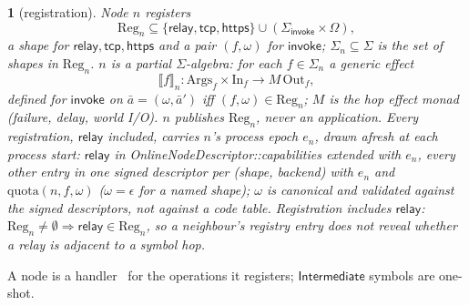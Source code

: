 \documentclass[journal]{IEEEtran}
\newcommand{\namedhead}{}
\newtheorem*{namedenv}{\namedhead}
\newenvironment{defD}[2]{\renewcommand{\namedhead}{Definition #1}%
  \begin{namedenv}[#2]}{\end{namedenv}}
\newcommand{\sem}[1]{\llbracket #1\rrbracket}
\newcommand{\relay}{\mathsf{relay}}
\newcommand{\Int}{\mathsf{Intermediate}}
\newcommand{\quota}{\mathrm{quota}}
\newcommand{\Args}{\mathrm{Args}}
\newcommand{\In}{\mathrm{In}}
\newcommand{\Out}{\mathrm{Out}}
\DeclareRobustCommand{\code}[1]{{\ttfamily\renewcommand{\_}{\textunderscore\allowbreak}#1}}
\begin{document}
\begin{defD}{D2}{registration}
Node $n$ registers
\[
\mathrm{Reg}_n\subseteq\{\relay,\mathsf{tcp},\mathsf{https}\}\cup
(\Sigma_{\mathsf{invoke}}\times\Omega),
\]
a shape for $\relay,\mathsf{tcp},\mathsf{https}$ and a pair
$(f,\omega)$ for $\mathsf{invoke}$; $\Sigma_n\subseteq\Sigma$ is the set of
shapes in $\mathrm{Reg}_n$.  $n$ is a partial $\Sigma$-algebra: for each
$f\in\Sigma_n$ a generic effect~\cite{Plotkin2003}
\[
\sem{f}_n:\Args_f\times\In_f\to M\,\Out_f ,
\]
defined for $\mathsf{invoke}$ on $\bar a=(\omega,\bar a')$ iff
$(f,\omega)\in\mathrm{Reg}_n$; $M$ is the hop effect monad (failure, delay,
world I/O).  $n$ publishes $\mathrm{Reg}_n$, never an application.  Every
registration, $\relay$ included, carries $n$'s process epoch $e_n$, drawn
afresh at each process start: $\relay$ in
\code{OnlineNodeDescriptor::capabilities} extended with $e_n$, every other
entry in one signed descriptor per (shape, backend) with $e_n$ and
$\quota(n,f,\omega)$ ($\omega=\epsilon$ for a named shape); $\omega$ is canonical and validated against the
signed descriptors, not against a code table.
Registration includes $\relay$: $\mathrm{Reg}_n\ne\emptyset\Rightarrow\relay\in
\mathrm{Reg}_n$, so a neighbour's registry entry does not reveal whether a relay
is adjacent to a symbol hop.
\end{defD}

A node is a handler~\cite{Plotkin2009} for the operations it registers;
$\Int$ symbols are one-shot.
\end{document}
